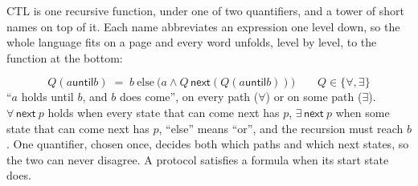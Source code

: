 CTL is one recursive function, under one of two quantifiers, and a tower of short names on top
of it.
Each name abbreviates an expression one level down, so the whole language fits on a page
and every word unfolds, level by level, to the function at the bottom:

\begin{definition}[CTL]\label{def:ctl}
\[
Q(a \mathbin{\mathsf{until}} b) \;=\; b \ \text{else}\ \big(a \wedge Q\,\mathsf{next}(Q(a \mathbin{\mathsf{until}} b))\big)
\qquad Q \in \{\forall, \exists\}
\]
``$a$ holds until $b$, and $b$ does come'', on every path ($\forall$) or on some path
($\exists$). $\forall\,\mathsf{next}\ p$ holds when every state that can come next has $p$,
$\exists\,\mathsf{next}\ p$ when some state that can come next has $p$, ``else'' means ``or'',
and the recursion must reach $b$. One quantifier, chosen once, decides both which paths and
which next states, so the two can never disagree. A protocol satisfies a formula when its
start state does.
\end{definition}

